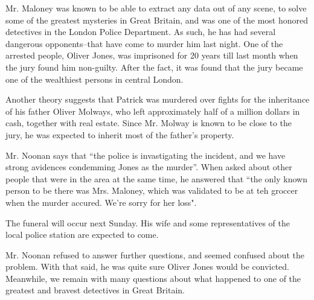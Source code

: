 \documentclass[]{article}
\begin{document}
\begin{multicols}{2}
		\noindent Mr. Maloney was known to be able to extract any data out of any scene, to solve some of the greatest mysteries in Great Britain, and was one of the most honored detectives in the London Police Department. As such, he has had several dangerous opponents--that have come to murder him last night. One of the arrested people, Oliver Jones, was imprisoned for 20 years till last month when the jury found him non-guilty. After the fact, it was found that the jury became one of the wealthiest persons in central London. 
		
		Another theory suggests that Patrick was murdered over fights for the inheritance of his father Oliver Molways, who left approximately half of a million dollars in cash, together with real estate. Since Mr. Molway is known to be close to the jury, he was expected to inherit most of the father's property. 
		
		Mr. Noonan says that ``the police is invastigating the incident, and we have strong avidences condemming Jones as the murder''. When asked about other people that were in the area at the same time, he answered that ``the only known person to be there was Mrs. Maloney, which was validated to be at teh groccer when the murder accured. We're sorry for her loss". 
		
		The funeral will occur next Sunday. His wife and some representatives of the local police station are expected to come. 
		
		Mr. Noonan refused to answer further questions, and seemed confused about the problem. With that said, he was quite sure Oliver Jones would be convicted. Meanwhile, we remain with many questions about what happened to one of the greatest and bravest detectives in Great Britain. 
		
	\end{multicols}
	
	\vfill
	
\end{document}
